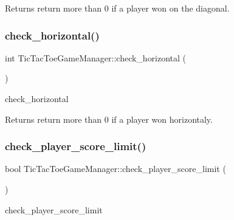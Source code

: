 \begin{DoxyReturn}{Returns}
return more than 0 if a player won on the diagonal. 
\end{DoxyReturn}
\mbox{\label{class_tic_tac_toe_game_manager_af5045a121fc7c8f66bf8977ca2efb7b7}} 
\subsubsection{\texorpdfstring{check\+\_\+horizontal()}{check\_horizontal()}}
{\footnotesize\ttfamily int Tic\+Tac\+Toe\+Game\+Manager\+::check\+\_\+horizontal (\begin{DoxyParamCaption}{ }\end{DoxyParamCaption})\hspace{0.3cm}{\ttfamily [protected]}}



check\+\_\+horizontal 

\begin{DoxyReturn}{Returns}
return more than 0 if a player won horizontaly. 
\end{DoxyReturn}
\mbox{\label{class_tic_tac_toe_game_manager_aeac0a0f9d52ecf828f0827a2069e36ca}} 
\subsubsection{\texorpdfstring{check\+\_\+player\+\_\+score\+\_\+limit()}{check\_player\_score\_limit()}}
{\footnotesize\ttfamily bool Tic\+Tac\+Toe\+Game\+Manager\+::check\+\_\+player\+\_\+score\+\_\+limit (\begin{DoxyParamCaption}{ }\end{DoxyParamCaption})\hspace{0.3cm}{\ttfamily [protected]}}



check\+\_\+player\+\_\+score\+\_\+limit 

